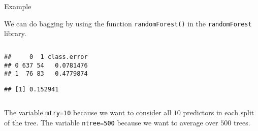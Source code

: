 \documentclass[
  10pt,
  ignorenonframetext,
]{beamer}
\newenvironment{Shaded}{\begin{snugshade}}{\end{snugshade}}
\newcommand{\AttributeTok}[1]{\textcolor[rgb]{0.77,0.63,0.00}{#1}}
\newcommand{\ConstantTok}[1]{\textcolor[rgb]{0.00,0.00,0.00}{#1}}
\newcommand{\DecValTok}[1]{\textcolor[rgb]{0.00,0.00,0.81}{#1}}
\newcommand{\FunctionTok}[1]{\textcolor[rgb]{0.00,0.00,0.00}{#1}}
\newcommand{\NormalTok}[1]{#1}
\newcommand{\OtherTok}[1]{\textcolor[rgb]{0.56,0.35,0.01}{#1}}
\newcommand{\SpecialCharTok}[1]{\textcolor[rgb]{0.00,0.00,0.00}{#1}}
\begin{document}
\begin{frame}[fragile]
\begin{block}{Example}
\protect\hypertarget{example}{}
\(~\)

We can do bagging by using the function \texttt{randomForest()} in the
\texttt{randomForest} library.

\(~\)

\scriptsize

\begin{Shaded}
\end{Shaded}

\begin{verbatim}
##     0  1 class.error
## 0 637 54   0.0781476
## 1  76 83   0.4779874
\end{verbatim}

\begin{Shaded}
\end{Shaded}

\begin{verbatim}
## [1] 0.152941
\end{verbatim}

\normalsize

\(~\)

The variable \texttt{mtry=10} because we want to consider all \(10\)
predictors in each split of the tree. The variable \texttt{ntree=500}
because we want to average over \(500\) trees.
\end{block}
\end{frame}
\end{document}
